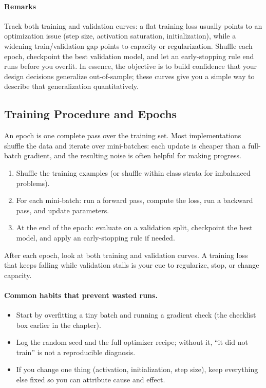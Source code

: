 \paragraph{Remarks}

Track both training and validation curves: a flat training loss usually points to an optimization issue (step size, activation saturation, initialization), while a widening train/validation gap points to capacity or regularization. Shuffle each epoch, checkpoint the best validation model, and let an early-stopping rule end runs before you overfit. In essence, the objective is to build confidence that your design decisions generalize out-of-sample; these curves give you a simple way to describe that generalization quantitatively.

\subsection{Training Procedure and Epochs}
\label{sec:backprop_training_procedure_and_epochs_in_multi_layer_perceptrons}

An epoch is one complete pass over the training set. Most implementations shuffle the data and iterate over mini\hyp{}batches: each update is cheaper than a full-batch gradient, and the resulting noise is often helpful for making progress.

\begin{enumerate}
    \item Shuffle the training examples (or shuffle within class strata for imbalanced problems).
    \item For each mini\hyp{}batch: run a forward pass, compute the loss, run a backward pass, and update parameters.
    \item At the end of the epoch: evaluate on a validation split, checkpoint the best model, and apply an early\hyp{}stopping rule if needed.
\end{enumerate}

After each epoch, look at both training and validation curves. A training loss that keeps falling while validation stalls is your cue to regularize, stop, or change capacity.

\paragraph{Common habits that prevent wasted runs.}
\begin{itemize}
    \item Start by overfitting a tiny batch and running a gradient check (the checklist box earlier in the chapter).
    \item Log the random seed and the full optimizer recipe; without it, ``it did not train'' is not a reproducible diagnosis.
    \item If you change one thing (activation, initialization, step size), keep everything else fixed so you can attribute cause and effect.
\end{itemize}

